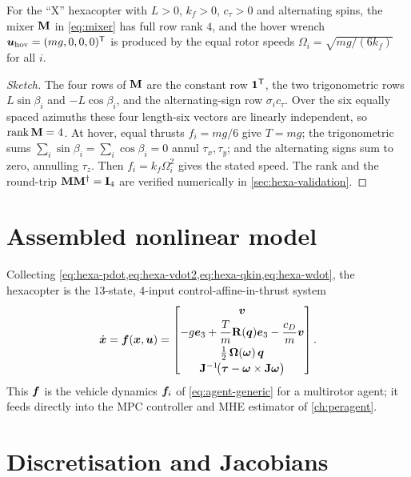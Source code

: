 \begin{proposition}
\label{prop:mixer}
For the ``X'' hexacopter with $L>0$, $k_f>0$, $c_\tau>0$ and alternating spins,
the mixer $\mathbf{M}$ in \cref{eq:mixer} has full row rank $4$, and the hover
wrench $\bm{u}_{\mathrm{hov}}=(mg,0,0,0)^{\mathsf{T}}$ is produced by the equal rotor speeds
$\Omega_i=\sqrt{mg/(6k_f)}$ for all $i$.
\end{proposition}
\begin{proof}[Sketch]
The four rows of $\mathbf{M}$ are the constant row $\bm{1}^{\mathsf{T}}$, the two trigonometric
rows $L\sin\beta_i$ and $-L\cos\beta_i$, and the alternating-sign row
$\sigma_ic_\tau$. Over the six equally spaced azimuths these four length-six
vectors are linearly independent, so $\operatorname{rank}\mathbf{M}=4$. At hover,
equal thrusts $f_i=mg/6$ give $T=mg$; the trigonometric sums
$\sum_i\sin\beta_i=\sum_i\cos\beta_i=0$ annul $\tau_x,\tau_y$; and the alternating
signs sum to zero, annulling $\tau_z$. Then $f_i=k_f\Omega_i^2$ gives the stated
speed. The rank and the round-trip $\mathbf{M}\mathbf{M}^{\dagger}=\mathbf{I}_4$ are
verified numerically in \cref{sec:hexa-validation}.
\end{proof}

\section{Assembled nonlinear model}

Collecting \cref{eq:hexa-pdot,eq:hexa-vdot2,eq:hexa-qkin,eq:hexa-wdot}, the
hexacopter is the $13$-state, $4$-input control-affine-in-thrust system
\begin{equation}
\dot{\bm{x}}=\bm{f}(\bm{x},\bm{u})=
\begin{bmatrix}
\bm{v}\\[2pt]
-g\bm{e}_3+\dfrac{T}{m}\mathbf{R}(\bm{q})\bm{e}_3-\dfrac{c_D}{m}\bm{v}\\[6pt]
\tfrac12\,\bm{\Omega}(\bm{\omega})\,\bm{q}\\[2pt]
\mathbf{J}^{-1}\!\bigl(\bm{\tau}-\bm{\omega}\times\mathbf{J}\bm{\omega}\bigr)
\end{bmatrix}.
\label{eq:hexa-full}
\end{equation}
This $\bm{f}$ is the vehicle dynamics $\bm{f}_i$ of \cref{eq:agent-generic} for a
multirotor agent; it feeds directly into the MPC controller and MHE estimator of
\cref{ch:peragent}.

\section{Discretisation and Jacobians}
\label{sec:hexa-disc}

